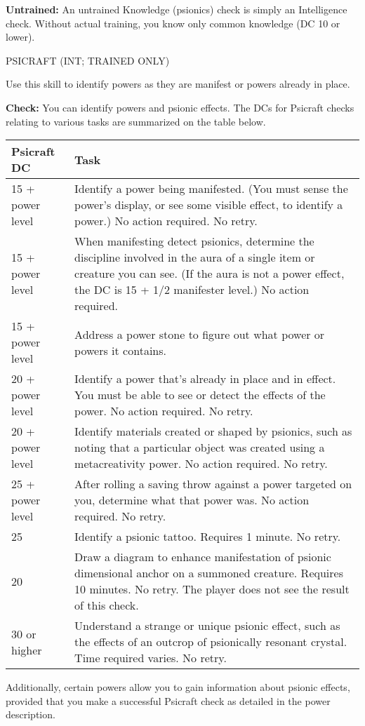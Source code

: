 \documentclass{article}
\begin{document}
\textbf{Untrained:} An untrained Knowledge (psionics) check is simply an Intelligence 
check. Without actual training, you know only common knowledge (DC 10 or lower).

\vspace{12pt}
PSICRAFT (INT; TRAINED ONLY)

Use this skill to identify powers as they are manifest or powers already in place.

\textbf{Check:} You can identify powers and psionic effects. The DCs for Psicraft 
checks relating to various tasks are summarized on the table below.

\vspace{12pt}
\begin{tabular}{|>{\raggedright}p{50pt}|>{\raggedright}p{276pt}|}
\hline
P\textbf{sicraft DC } & T\textbf{ask}\tabularnewline
\hline
15 + power level  & Identify a power being manifested. (You must sense the power's 
display, or see some visible effect, to identify a power.) No action required. 
No retry.\tabularnewline
\hline
15 + power level & When manifesting detect psionics, determine the discipline involved 
in the aura of a single item or creature you can see. (If the aura is not a power 
effect, the DC is 15 + 1/2 manifester level.) No action required.\tabularnewline
\hline
15 + power level & Address a power stone to figure out what power or powers it 
contains.\tabularnewline
\hline
20 + power level & Identify a power that's already in place and in effect. You 
must be able to see or detect the effects of the power. No action required. No 
retry.\tabularnewline
\hline
20 + power level & Identify materials created or shaped by psionics, such as noting 
that a particular object was created using a metacreativity power. No action required. 
No retry.\tabularnewline
\hline
25 + power level & After rolling a saving throw against a power targeted on you, 
determine what that power was. No action required. No retry.\tabularnewline
\hline
25 & Identify a psionic tattoo. Requires 1 minute. No retry.\tabularnewline
\hline
20 & Draw a diagram to enhance manifestation of psionic dimensional anchor on a 
summoned creature. Requires 10 minutes. No retry. The player does not see the result 
of this check.\tabularnewline
\hline
30 or higher & Understand a strange or unique psionic effect, such as the effects 
of an outcrop of psionically resonant crystal. Time required varies. No retry.\tabularnewline
\hline
\end{tabular}

\vspace{12pt}
Additionally, certain powers allow you to gain information about psionic effects, 
provided that you make a successful Psicraft check as detailed in the power description.
\end{document}
